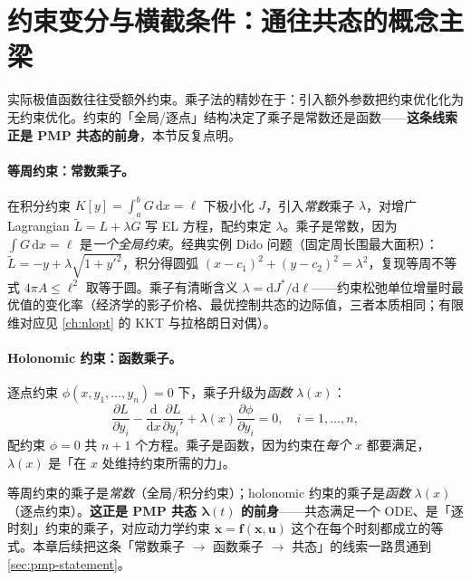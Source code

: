 \section{约束变分与横截条件：通往共态的概念主梁}
\label{sec:pmp-constraints}

实际极值函数往往受额外约束。乘子法的精妙在于：引入额外参数把约束优化化为无约束优化。约束的「全局/逐点」结构决定了乘子是常数还是函数——\textbf{这条线索正是 PMP 共态的前身}，本节反复点明。

\paragraph{等周约束：常数乘子。}
在积分约束 $K[y]=\int_a^b G\,\mathrm dx=\ell$ 下极小化 $J$，引入\emph{常数}乘子 $\lambda$，对增广 Lagrangian $\tilde L=L+\lambda G$ 写 EL 方程，配约束定 $\lambda$。乘子是常数，因为 $\int G\,\mathrm dx=\ell$ 是\emph{一个全局约束}。经典实例 Dido 问题（固定周长围最大面积）：$\tilde L=-y+\lambda\sqrt{1+y'^2}$，积分得圆弧 $(x-c_1)^2+(y-c_2)^2=\lambda^2$，复现等周不等式 $4\pi A\le \ell^2$ 取等于圆。乘子有清晰含义 $\lambda=\mathrm dJ^\ast/\mathrm d\ell$——约束松弛单位增量时最优值的变化率（经济学的影子价格、最优控制共态的边际值，三者本质相同；有限维对应见 \cref{ch:nlopt} 的 KKT 与拉格朗日对偶）。

\paragraph{Holonomic 约束：函数乘子。}
逐点约束 $\phi(x,y_1,\dots,y_n)=0$ 下，乘子升级为\emph{函数} $\lambda(x)$：
\begin{equation}
  \frac{\partial L}{\partial y_i}-\frac{\mathrm d}{\mathrm dx}\frac{\partial L}{\partial y_i'}+\lambda(x)\frac{\partial\phi}{\partial y_i}=0,\quad i=1,\dots,n,
  \label{eq:pmp-holonomic}
\end{equation}
配约束 $\phi=0$ 共 $n+1$ 个方程。乘子是函数，因为约束在\emph{每个} $x$ 都要满足，$\lambda(x)$ 是「在 $x$ 处维持约束所需的力」。

\begin{insight}[贯穿全章的概念主梁]
等周约束的乘子是\emph{常数}（全局/积分约束）；holonomic 约束的乘子是\emph{函数} $\lambda(x)$（逐点约束）。\textbf{这正是 PMP 共态 $\boldsymbol\lambda(t)$ 的前身}——共态满足一个 ODE、是「逐时刻」约束的乘子，对应动力学约束 $\dot{\mathbf x}=\mathbf f(\mathbf x,\mathbf u)$ 这个在每个时刻都成立的等式。本章后续把这条「常数乘子 $\to$ 函数乘子 $\to$ 共态」的线索一路贯通到 \cref{sec:pmp-statement}。
\end{insight}

